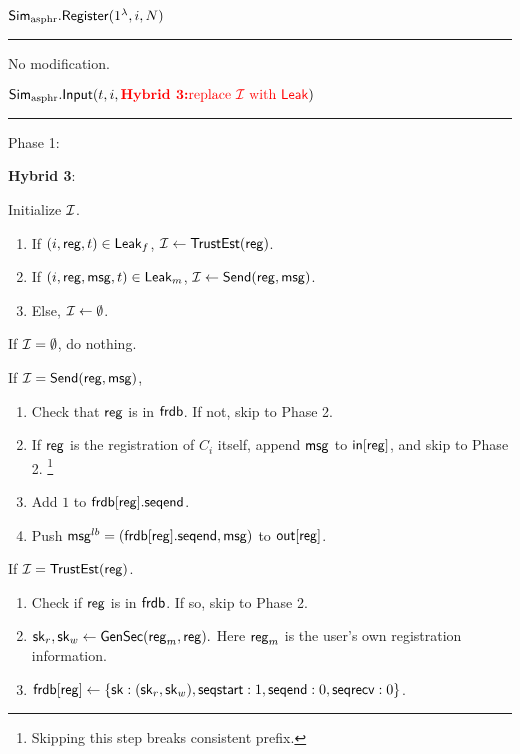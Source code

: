 
\vspace{10pt}

$\mathbf{\mathsf{Sim}_{\text{asphr}}.\mathsf{Register}}(1^{\lambda}, i, N)$
\vspace{5pt}
\hrule
\vspace{5pt}
No modification.
\vspace{10pt}

$\mathbf{\mathsf{Sim}_{\text{asphr}}.\mathsf{Input}}(t, i, {\color{red} \textbf{Hybrid 3:} \text{replace $\mathcal{I}$ with $\mathsf{Leak}$}})$
\vspace{5pt}
\hrule
\vspace{5pt}
Phase 1: 

{
\color{red} 

\textbf{Hybrid 3}:

Initialize $\mathcal{I}$.

\begin{enumerate}
    \item If $(i, \mathsf{reg}, t) \in \mathsf{Leak}_f$, $\mathcal{I} \leftarrow \mathsf{TrustEst}(\mathsf{reg})$.
    \item If $(i, \mathsf{reg}, \mathsf{msg}, t) \in \mathsf{Leak}_m$, $\mathcal{I} \leftarrow \mathsf{Send}(\mathsf{reg}, \mathsf{msg})$.
    \item Else, $\mathcal{I} \leftarrow \emptyset$.
\end{enumerate}

}

If $\mathcal{I} = \emptyset$, do nothing. 

If $\mathcal{I} = \mathsf{Send}(\mathsf{reg}, \mathsf{msg})$, 

\begin{enumerate}
    \item Check that $\mathsf{reg}$ is in $\mathsf{frdb}$. If not, skip to Phase 2.
    \item If $\mathsf{reg}$ is the registration of $C_i$ itself, append $\mathsf{msg}$ to $\mathsf{in}[\mathsf{reg}]$, and skip to Phase 2. \footnote{Skipping this step breaks consistent prefix.}
    \item Add $1$ to $\mathsf{frdb}[\mathsf{reg}].\mathsf{seqend}$. 
    \item Push $\mathsf{msg}^{lb} = (\mathsf{frdb}[\mathsf{reg}].\mathsf{seqend}, \mathsf{msg})$ to $\mathsf{out}[\mathsf{reg}]$.
\end{enumerate}

If $\mathcal{I} = \mathsf{TrustEst}(\mathsf{reg})$.
\begin{enumerate}
    \item Check if $\mathsf{reg}$ is in $\mathsf{frdb}$. If so, skip to Phase 2.
    \item ${\mathsf{sk}}_r, {\mathsf{sk}}_w \leftarrow \mathsf{GenSec}(\mathsf{reg}_m, \mathsf{reg}).$ Here $\mathsf{reg}_m$ is the user's own registration information.
    \item $\mathsf{frdb}[\mathsf{reg}] \leftarrow \{{\mathsf{sk}}: ({\mathsf{sk}}_r, {\mathsf{sk}}_w),  \mathsf{seqstart}: 1, \mathsf{seqend}: 0, \quad \\ \mathsf{seqrecv}: 0\}$.
\end{enumerate}

